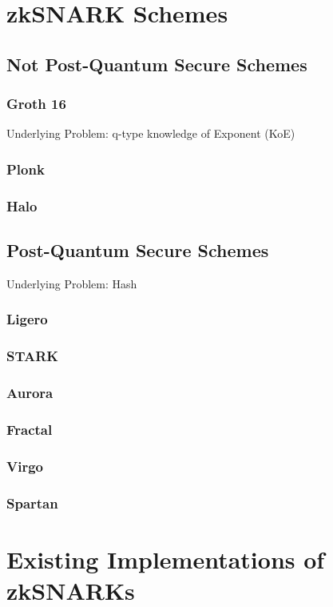 \section{zkSNARK Schemes}


\subsection{Not Post-Quantum Secure Schemes}
\subsubsection{Groth 16}
Underlying Problem: q-type knowledge of Exponent (KoE)
\subsubsection{Plonk}

\subsubsection{Halo}


\subsection{Post-Quantum Secure Schemes}
Underlying Problem: Hash

\subsubsection{Ligero}

\subsubsection{STARK}

\subsubsection{Aurora}

\subsubsection{Fractal}

\subsubsection{Virgo}

\subsubsection{Spartan}



\section{Existing Implementations of zkSNARKs}
